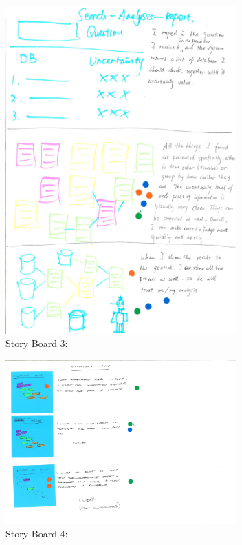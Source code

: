 \documentclass[journal]{vgtc}                %
\begin{document}
\begin{figure}[htb]
 \centering
 \includegraphics[width=3.5in]{img/kai}
 \caption{ Story Board 3: }
\end{figure}

\begin{figure}[htb]
 \centering
 \includegraphics[width=3.5in]{img/mike}
 \caption{ Story Board 4: }
\end{figure}
\end{document}
